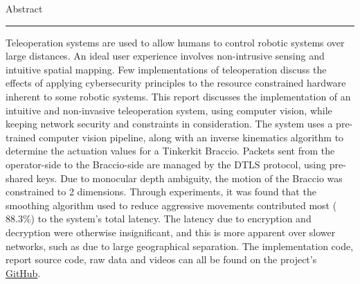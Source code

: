 \newpage
{\Large Abstract}\\
\hrule


Teleoperation systems are used to allow humans to control robotic systems over large distances. An ideal user experience involves non-intrusive sensing and intuitive spatial mapping. Few implementations of teleoperation discuss the effects of applying cybersecurity principles to the resource constrained hardware inherent to some robotic systems. This report discusses the implementation of an intuitive and non-invasive teleoperation system, using computer vision, while keeping network security and constraints in consideration. The system uses a pre-trained computer vision pipeline, along with an inverse kinematics algorithm to determine the actuation values for a Tinkerkit Braccio. Packets sent from the operator-side to the Braccio-side are managed by the DTLS protocol, using pre-shared keys. Due to monocular depth ambiguity, the motion of the Braccio was constrained to 2 dimensions. Through experiments, it was found that the smoothing algorithm used to reduce aggressive movements contributed most ($88.3\%$) to the system's total latency. The latency due to encryption and decryption were otherwise insignificant, and this is more apparent over slower networks, such as due to large geographical separation. The implementation code, report source code, raw data and videos can all be found on the project's \href{https://github.com/Neo-Vorsatz-UCT/eee4022s}{GitHub}.
